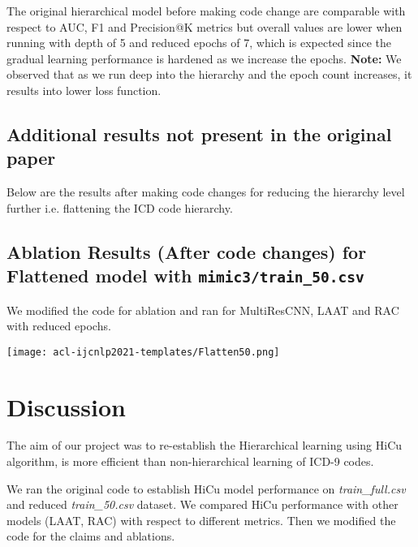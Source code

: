 \documentclass[11pt,a4paper]{article}
\begin{document}
The original hierarchical model before making code change are comparable with respect to AUC, F1 and Precision@K metrics but overall values are lower when running with depth of 5 and reduced epochs of 7, which is expected since the gradual learning performance is hardened as we increase the epochs.
\textbf{Note:} We observed that as we run deep into the hierarchy and the epoch count increases, it results into lower loss function.

\subsection{Additional results not present in the original paper}
Below are the results after making code changes for reducing the hierarchy level further i.e. flattening the ICD code hierarchy. 

\subsection{Ablation Results (After code changes) for Flattened model with \texttt{mimic3/train\_50.csv}}
We modified the code for ablation and ran for MultiResCNN, LAAT and RAC with reduced epochs.

\begin{flushleft}\texttt{[image: acl-ijcnlp2021-templates/Flatten50.png]}\end{flushleft}

\section{Discussion}

The aim of our project was to re-establish the Hierarchical learning using HiCu algorithm, is more efficient than non-hierarchical learning of ICD-9 codes. 

We ran the original code to establish HiCu model performance on \textit{train\_full.csv} and reduced \textit{train\_50.csv} dataset. We compared HiCu performance with other models (LAAT, RAC) with respect to different metrics. Then we modified the code for the claims and ablations. 
\end{document}
